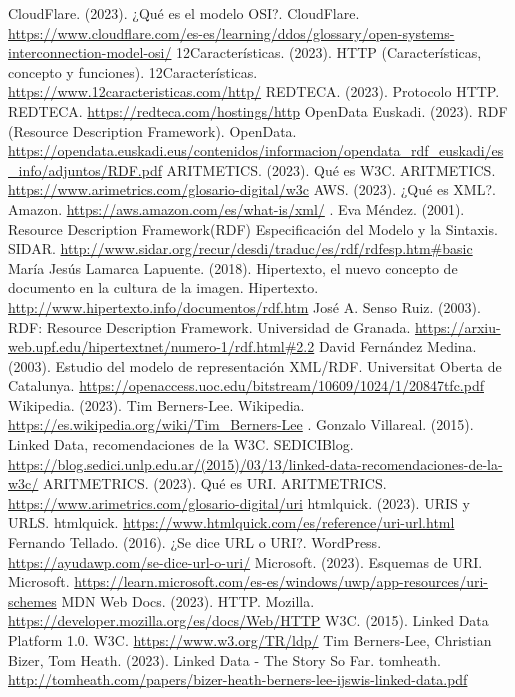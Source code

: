 \documentclass[11pt]{report}
\begin{document}
\begin{thebibliography}{99}
	 CloudFlare. (2023).  ¿Qué es el modelo OSI?.  CloudFlare.  \url{https://www.cloudflare.com/es-es/learning/ddos/glossary/open-systems-interconnection-model-osi/}
	 12Características. (2023). HTTP (Características, concepto y funciones). 12Características. \url{https://www.12caracteristicas.com/http/}
	 REDTECA. (2023). Protocolo HTTP. REDTECA. \url{https://redteca.com/hostings/http}
	OpenData Euskadi. (2023). RDF (Resource Description Framework). OpenData. \url{https://opendata.euskadi.eus/contenidos/informacion/opendata_rdf_euskadi/es_info/adjuntos/RDF.pdf}
	 ARITMETICS. (2023). Qué es W3C. ARITMETICS. \url{https://www.arimetrics.com/glosario-digital/w3c}
	 AWS. (2023). ¿Qué es XML?. Amazon. \url{https://aws.amazon.com/es/what-is/xml/}
	.  Eva Méndez. (2001). Resource Description Framework(RDF)	Especificación del Modelo y la Sintaxis. SIDAR. \url{http://www.sidar.org/recur/desdi/traduc/es/rdf/rdfesp.htm#basic}
	 María Jesús Lamarca Lapuente. (2018). Hipertexto, el nuevo concepto de documento en la cultura de la imagen. Hipertexto. \url{http://www.hipertexto.info/documentos/rdf.htm}
	 José A. Senso Ruiz. (2003). RDF: Resource Description Framework. Universidad de Granada. \url{https://arxiu-web.upf.edu/hipertextnet/numero-1/rdf.html#2.2}
	 David Fernández Medina. (2003). Estudio del modelo de representación XML/RDF. Universitat Oberta de Catalunya. \url{https://openaccess.uoc.edu/bitstream/10609/1024/1/20847tfc.pdf}
	 Wikipedia. (2023). Tim Berners-Lee. Wikipedia. \url{https://es.wikipedia.org/wiki/Tim_Berners-Lee}
	. Gonzalo Villareal. (2015). Linked Data, recomendaciones de la W3C. SEDICIBlog. \url{https://blog.sedici.unlp.edu.ar/(2015)/03/13/linked-data-recomendaciones-de-la-w3c/}
	 ARITMETRICS. (2023). Qué es URI. ARITMETRICS. \url{https://www.arimetrics.com/glosario-digital/uri}
	 htmlquick. (2023). URIS y URLS. htmlquick. \url{https://www.htmlquick.com/es/reference/uri-url.html}
	 Fernando Tellado. (2016). ¿Se dice URL o URI?. WordPress. \url{https://ayudawp.com/se-dice-url-o-uri/}
	 Microsoft. (2023). Esquemas de URI. Microsoft. \url{https://learn.microsoft.com/es-es/windows/uwp/app-resources/uri-schemes}
	 MDN Web Docs. (2023). HTTP. Mozilla. \url{https://developer.mozilla.org/es/docs/Web/HTTP}
	 W3C. (2015). Linked Data Platform 1.0. W3C. \url{https://www.w3.org/TR/ldp/}
	 Tim Berners-Lee, Christian Bizer, Tom Heath. (2023). Linked Data - The Story So Far. tomheath. \url{http://tomheath.com/papers/bizer-heath-berners-lee-ijswis-linked-data.pdf}

\end{thebibliography}
\end{document}
